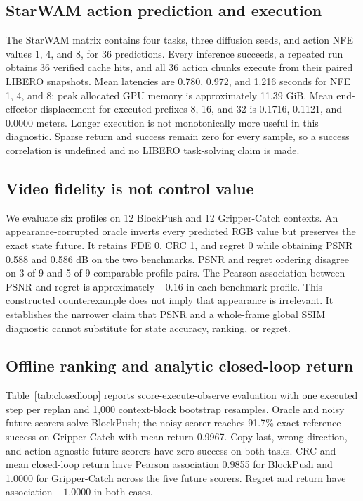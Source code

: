 \documentclass[10pt]{article}
\begin{document}
\subsection{StarWAM action prediction and execution}

The StarWAM matrix contains four tasks, three diffusion seeds, and action NFE values 1, 4,
and 8, for 36 predictions. Every inference succeeds, a repeated run obtains 36 verified
cache hits, and all 36 action chunks execute from their paired LIBERO snapshots. Mean
latencies are 0.780, 0.972, and 1.216 seconds for NFE 1, 4, and 8; peak allocated GPU memory
is approximately 11.39 GiB. Mean end-effector displacement for executed prefixes 8, 16,
and 32 is 0.1716, 0.1121, and 0.0000 meters. Longer execution is not monotonically more
useful in this diagnostic. Sparse return and success remain zero for every sample, so a
success correlation is undefined and no LIBERO task-solving claim is made.

\subsection{Video fidelity is not control value}

We evaluate six profiles on 12 BlockPush and 12 Gripper-Catch contexts. An
appearance-corrupted oracle inverts every predicted RGB value but preserves the exact
state future. It retains FDE 0, CRC 1, and regret 0 while obtaining PSNR 0.588 and 0.586 dB
on the two benchmarks. PSNR and regret ordering disagree on 3 of 9 and 5 of 9 comparable
profile pairs. The Pearson association between PSNR and regret is approximately $-0.16$
in each benchmark profile. This constructed counterexample does not imply that appearance
is irrelevant. It establishes the narrower claim that PSNR and a whole-frame global SSIM
diagnostic cannot substitute for state accuracy, ranking, or regret.

\subsection{Offline ranking and analytic closed-loop return}

Table~\ref{tab:closedloop} reports score-execute-observe evaluation with one executed step
per replan and 1,000 context-block bootstrap resamples. Oracle and noisy future scorers
solve BlockPush; the noisy scorer reaches 91.7\% exact-reference success on Gripper-Catch
with mean return 0.9967. Copy-last, wrong-direction, and action-agnostic future scorers have
zero success on both tasks. CRC and mean closed-loop return have Pearson association 0.9855
for BlockPush and 1.0000 for Gripper-Catch across the five future scorers. Regret and return
have association $-1.0000$ in both cases.
\end{document}
